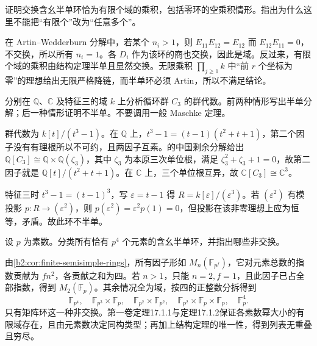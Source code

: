 \begin{exercise}\label{b2:ex:13-commutative-semisimple}
	证明交换含幺半单环恰为有限个域的乘积，包括零环的空乘积情形。指出为什么这里不能把“有限个”改为“任意多个”。
\end{exercise}
\begin{solution}
	在 Artin–Wedderburn 分解中，若某个 \(n_i>1\)，则 \(E_{11}E_{12}=E_{12}\) 而 \(E_{12}E_{11}=0\)，不交换，所以所有 \(n_i=1\)。各 \(D_i\) 作为该环的商也交换，因此是域。反过来，有限个域的乘积由结构定理半单且显然交换。无限乘积 \(\prod_{j\ge1}k\) 中“前 \(r\) 个坐标为零”的理想给出无限严格降链，而半单环必须 Artin，所以不满足结论。
\end{solution}

\begin{exercise}\label{b2:ex:13-cyclic-three}
	分别在 \(\mathbb Q\)、\(\mathbb C\) 及特征三的域 \(k\) 上分析循环群 \(C_3\) 的群代数。前两种情形写出半单分解；后一种情形证明不半单。不要调用一般 Maschke 定理。
\end{exercise}
\begin{solution}
	群代数为 \(k[t]/(t^3-1)\)。在 \(\mathbb Q\) 上，\(t^3-1=(t-1)(t^2+t+1)\)，第二个因子没有有理根所以不可约，且两因子互素。的中国剩余分解给出 \(\mathbb Q[C_3]\cong\mathbb Q\times\mathbb Q(\zeta_3)\)，其中 \(\zeta_3\) 为本原三次单位根，满足 \(\zeta_3^2+\zeta_3+1=0\)，故第二因子就是 \(\mathbb Q[t]/(t^2+t+1)\)。在 \(\mathbb C\) 上，三个单位根互异，故 \(\mathbb C[C_3]\cong\mathbb C^3\)。

	特征三时 \(t^3-1=(t-1)^3\)，写 \(\varepsilon=t-1\) 得 \(R=k[\varepsilon]/(\varepsilon^3)\)。若 \((\varepsilon^2)\) 有模投影 \(p:R\to(\varepsilon^2)\)，则 \(p(\varepsilon^2)=\varepsilon^2p(1)=0\)，但投影在该非零理想上应为恒等，矛盾。故此环不半单。
\end{solution}

\begin{exercise}\label{b2:ex:13-finite-order-p-four}
	设 \(p\) 为素数。分类所有恰有 \(p^4\) 个元素的含幺半单环，并指出哪些非交换。
\end{exercise}
\begin{solution}
	由\cref{b2:cor:finite-semisimple-rings}，所有因子形如 \(M_n(\mathbb F_{p^f})\)，它对元素总数的指数贡献为 \(fn^2\)，各贡献之和为四。若 \(n>1\)，只能 \(n=2,f=1\)，且此因子已占全部指数，得到 \(M_2(\mathbb F_p)\)。其余情况全为域，按四的正整数分拆得到
	\[
		\mathbb F_{p^4},\quad \mathbb F_{p^3}\times\mathbb F_p,\quad \mathbb F_{p^2}\times\mathbb F_{p^2},\quad \mathbb F_{p^2}\times\mathbb F_p\times\mathbb F_p,\quad \mathbb F_p^4.
	\]
	只有矩阵环这一种非交换。第一卷定理17.1.1与定理17.1.2保证各素数幂大小的有限域存在，且由元素数决定同构类型；再加上结构定理的唯一性，得到列表无重叠且穷尽。
\end{solution}

